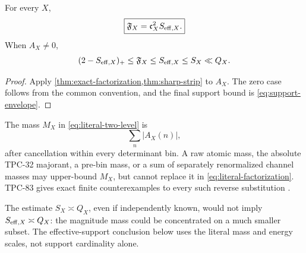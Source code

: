 \begin{theorem}
\label{thm:literal-factorization}
For every \(X\),
\begin{equation}
 \boxed{\mathfrak F_X=\mathfrak c_X^2S_{\mathrm{eff},X}.}
\label{eq:literal-factorization}
\end{equation}
When \(A_X\ne0\),
\begin{equation}
 (2-S_{\mathrm{eff},X})_+\le\mathfrak F_X\le S_{\mathrm{eff},X}\le S_X\ll Q_X.
\label{eq:literal-sharp-strip}
\end{equation}
\end{theorem}

\begin{proof}
Apply
\cref{thm:exact-factorization,thm:sharp-strip} to \(A_X\).
The zero case follows from the common convention, and the final
support bound is \eqref{eq:support-envelope}.
\end{proof}

\begin{remark}
\label{rem:post-bin-only}
The mass \(M_X\) in \eqref{eq:literal-two-level} is
\[
 \sum_n\left|A_X(n)\right|,
\]
after cancellation within every determinant bin.  A raw atomic mass,
the absolute TPC-32 majorant, a pre-bin mass, or a sum of separately
renormalized channel masses may upper-bound \(M_X\), but cannot
replace it in \eqref{eq:literal-factorization}.  TPC-83 gives exact
finite counterexamples to every such reverse substitution
\citep{WangTPC83}.
\end{remark}

\begin{remark}
The estimate \(S_X\asymp Q_X\), even if independently known, would
not imply \(S_{\mathrm{eff},X}\asymp Q_X\): the magnitude mass could be
concentrated on a much smaller subset.  The effective-support
conclusion below uses the literal mass and energy scales, not support
cardinality alone.
\end{remark}
